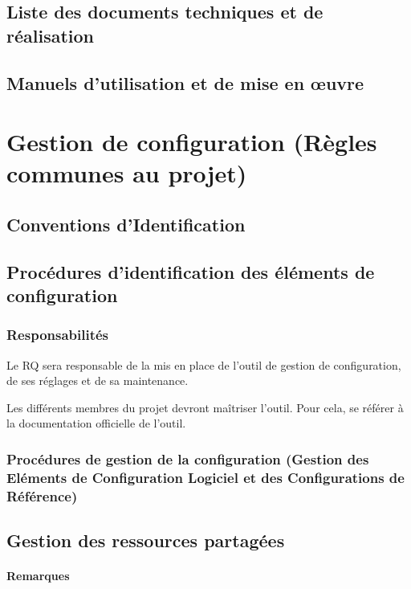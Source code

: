 \documentclass[a4paper]{article}
\begin{document}
\subsection{Liste des documents techniques et de réalisation}

\subsection{Manuels d'utilisation et de mise en œuvre}

\section{Gestion de configuration (Règles communes au projet)}

\subsection{Conventions d'Identification}

\subsection{Procédures d'identification des éléments de configuration }

\subsubsection{Responsabilités}

Le RQ sera responsable de la mis en place de l'outil de gestion de configuration, de ses réglages et de sa maintenance.

Les différents membres du projet devront maîtriser l'outil. Pour cela, se référer à la documentation officielle de l'outil.

\subsubsection{Procédures de gestion de la configuration (Gestion des Eléments de Configuration Logiciel et des Configurations de Référence)}

\subsection{Gestion des ressources partagées}

\paragraph{Remarques}
\end{document}

